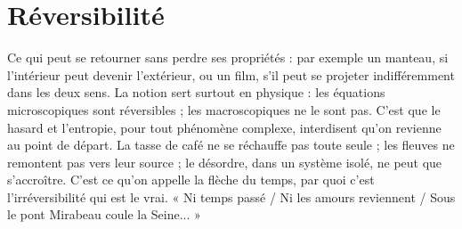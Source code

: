 \section{Réversibilité}
Ce qui peut se retourner sans perdre ses propriétés : par
exemple un manteau, si l’intérieur peut devenir l'extérieur,
ou un film, s’il peut se projeter indifféremment dans les deux sens. La notion sert
surtout en physique : les équations microscopiques sont réversibles ; les macroscopiques
ne le sont pas. C’est que le hasard et l’entropie, pour tout phénomène
complexe, interdisent qu’on revienne au point de départ. La tasse de café ne se
réchauffe pas toute seule ; les fleuves ne remontent pas vers leur source ; le
désordre, dans un système isolé, ne peut que s’accroître. C’est ce qu’on appelle la
flèche du temps, par quoi c’est l’irréversibilité qui est le vrai. « Ni temps passé /
Ni les amours reviennent / Sous le pont Mirabeau coule la Seine... »

